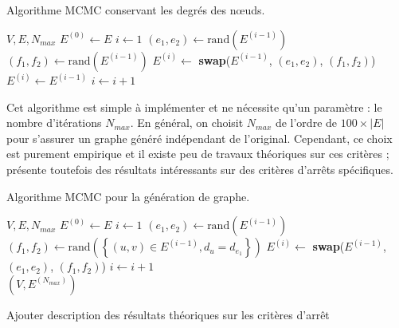 \documentclass[a4paper]{article}
\begin{document}
    \begin{algorithm}
        \caption{Algorithme MCMC conservant les degrés des n\oe{}uds.}
        \label{alg:mcmc_deg}
        \begin{algorithmic}[1]
            \Require $V, E, N_{max}$
            \State $E^{(0)} \gets E$
            \State $i \gets 1$
                \State $(e_1, e_2) \gets \text{rand}(E^{(i-1)})$
                \State $(f_1, f_2) \gets \text{rand}(E^{(i-1)})$
                    \State $E^{(i)} \gets$
                        \textbf{swap}($E^{(i-1)}$, $(e_1, e_2)$, $(f_1, f_2)$)
                \Else
                    \State $E^{(i)} \gets E^{(i-1)}$
                \EndIf
                \State $i \gets i + 1$
            \EndWhile
        \end{algorithmic}
    \end{algorithm}

    Cet algorithme est simple à implémenter et ne nécessite qu'un paramètre :
    le nombre d'itérations $N_{max}$. En général, on choisit $N_{max}$ de
    l'ordre de $100 \times |E|$ pour s'assurer un graphe généré indépendant de
    l'original. Cependant, ce choix est purement empirique et il existe peu
    de travaux théoriques sur ces critères ; \cite{ray2012we} présente
    toutefois des résultats intéressants sur des critères d'arrêts spécifiques.

    \begin{algorithm}
        \caption{Algorithme MCMC pour la génération de graphe.}
        \label{alg:mcmc_joint}
        \begin{algorithmic}
            \Require $V, E, N_{max}$
            \State $E^{(0)} \gets E$
            \State $i \gets 1$
                \State $(e_1, e_2) \gets \text{rand}(E^{(i-1)})$
                \State $(f_1, f_2) \gets \text{rand}(\left\{ (u, v) \in E^{(i-1)}, d_u = d_{e_1} \right\})$
                \State $E^{(i)} \gets$
                    \textbf{swap}($E^{(i-1)}$, $(e_1, e_2)$, $(f_1, f_2)$)
                \State $i \gets i + 1$
            \EndWhile \\
            \Return $(V, E^{(N_{max})})$
        \end{algorithmic}
    \end{algorithm}

\begin{todo}
Ajouter description des résultats théoriques sur les critères d'arrêt
\end{todo}
\end{document}
